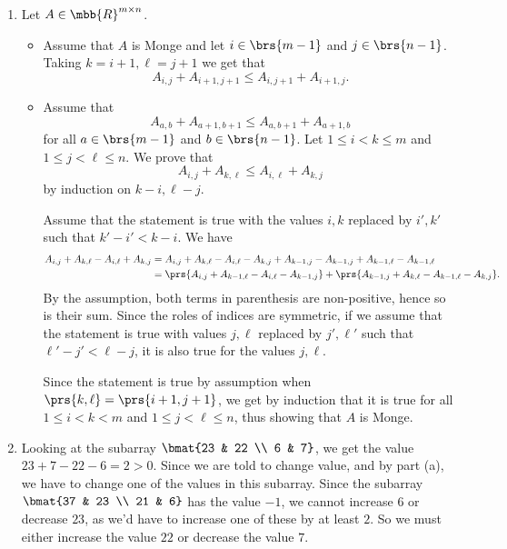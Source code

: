 \documentclass[oneside]{scrbook}
\theoremstyle{definition}
\begin{document}
\begin{problem}
\begin{enumerate}[label=\alph*.]
\item %
Let $A \in \mbb{R}^{m \times n}$.
\begin{itemize}
\item Assume that $A$ is Monge and let $i \in \brs{m-1}$ and $j \in \brs{n-1}$.
Taking $k = i+1, \ell = j+1$ we get that
\[A_{i,j} + A_{i+1, j+1} \leq A_{i,j+1} + A_{i+1,j} \text{.}\]

\item Assume that
\[A_{a,b} + A_{a+1, b+1} \leq A_{a,b+1} + A_{a+1,b}\]
for all $a \in \brs{m-1}$ and $b \in \brs{n-1}$.
Let $1 \leq i < k \leq m$ and $1 \leq j < \ell \leq n$.
We prove that
\[A_{i,j} + A_{k,\ell} \leq A_{i,\ell} + A_{k, j}\]
by induction on $k - i, \ell - j$.

Assume that the statement is true with the values $i,k$ replaced by $i',k'$ such that $k' - i' < k - i$. We have
\begin{align*}
A_{i,j} + A_{k,\ell} - A_{i,\ell} + A_{k, j} &= A_{i,j} + A_{k,\ell} - A_{i,\ell} - A_{k, j} + A_{k-1,j} - A_{k-1, j} + A_{k-1, \ell} - A_{k-1, \ell}
\\&= \prs{A_{i,j} + A_{k-1, \ell} - A_{i,\ell} - A_{k-1, j}} + \prs{A_{k-1, j} + A_{k, \ell} - A_{k-1, \ell} - A_{k, j}} \text{.}
\end{align*}
By the assumption, both terms in parenthesis are non-positive, hence so is their sum.
Since the roles of indices are symmetric, if we assume that the statement is true with values $j,\ell$ replaced by $j',\ell'$ such that $\ell' - j' < \ell - j$, it is also true for the values $j,\ell$.

Since the statement is true by assumption when $\prs{k,\ell} = \prs{i+1,j+1}$, we get by induction that it is true for all $1 \leq i < k < m$ and $1 \leq j < \ell \leq n$, thus showing that $A$ is Monge.
\end{itemize}

\item %
Looking at the subarray $\bmat{23 & 22 \\ 6 & 7}$, we get the value $23 + 7 - 22 - 6 = 2 > 0$. Since we are told to change value, and by part (a), we have to change one of the values in this subarray.
Since the subarray $\bmat{37 & 23 \\ 21 & 6}$ has the value $-1$, we cannot increase $6$ or decrease $23$, as we'd have to increase one of these by at least $2$. So we must either increase the value $22$ or decrease the value $7$.


\end{enumerate}
\end{problem}
\end{document}
